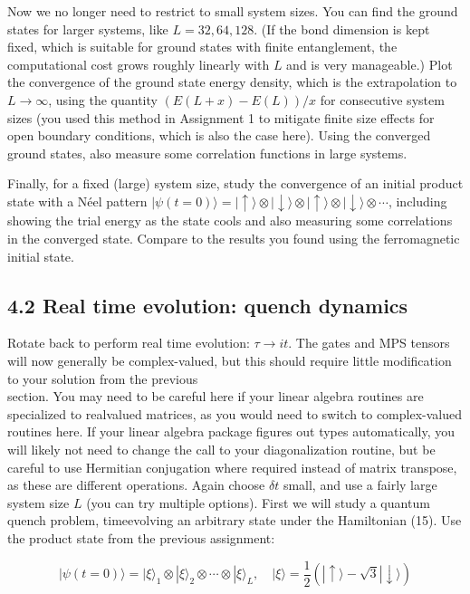 \documentclass[12pt]{article}
\begin{document}
Now we no longer need to restrict to small system sizes. You can find the ground states for larger systems, like $L=32,64,128$. (If the bond dimension is kept fixed, which is suitable for ground states with finite entanglement, the computational cost grows roughly linearly with $L$ and is very manageable.) Plot the convergence of the ground state energy density, which is the extrapolation to $L \rightarrow \infty$, using the quantity $(E(L+x)-E(L)) / x$ for consecutive system sizes (you used this method in Assignment 1 to mitigate finite size effects for open boundary conditions, which is also the case here). Using the converged ground states, also measure some correlation functions in large systems.

Finally, for a fixed (large) system size, study the convergence of an initial product state with a Néel pattern $|\psi(t=0)\rangle=|\uparrow\rangle \otimes|\downarrow\rangle \otimes|\uparrow\rangle \otimes|\downarrow\rangle \otimes \cdots$, including showing the trial energy as the state cools and also measuring some correlations in the converged state. Compare to the results you found using the ferromagnetic initial state.

\subsection*{4.2 Real time evolution: quench dynamics}
Rotate back to perform real time evolution: $\tau \rightarrow i t$. The gates and MPS tensors will now generally be complex-valued, but this should require little modification to your solution from the previous\\
section. You may need to be careful here if your linear algebra routines are specialized to realvalued matrices, as you would need to switch to complex-valued routines here. If your linear algebra package figures out types automatically, you will likely not need to change the call to your diagonalization routine, but be careful to use Hermitian conjugation where required instead of matrix transpose, as these are different operations. Again choose $\delta t$ small, and use a fairly large system size $L$ (you can try multiple options). First we will study a quantum quench problem, timeevolving an arbitrary state under the Hamiltonian (15). Use the product state from the previous assignment:


\begin{equation*}
|\psi(t=0)\rangle=|\xi\rangle_{1} \otimes|\xi\rangle_{2} \otimes \cdots \otimes|\xi\rangle_{L}, \quad|\xi\rangle=\frac{1}{2}(|\uparrow\rangle-\sqrt{3}|\downarrow\rangle) \tag{23}
\end{equation*}
\end{document}

